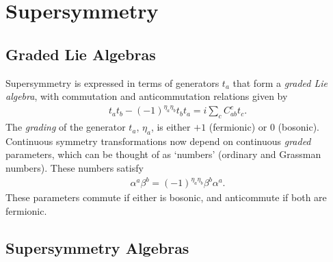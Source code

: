 \documentclass[twoside,english]{uiofysmaster}
\begin{document}
\chapter{Supersymmetry}

\section{Graded Lie Algebras}

Supersymmetry is expressed in terms of generators $t_a$ that form a \textit{graded Lie algebra}, with commutation and anticommutation relations given by
\begin{align}
t_at_b - (-1)^{\eta_a \eta_b} t_b t_a = i \sum_c C^c_{ab}t_c.
\end{align}
The \textit{grading} of the generator $t_a$, $\eta_a$, is either $+1$ (fermionic) or $0$ (bosonic). Continuous symmetry transformations now depend on continuous \textit{graded} parameters, which can be thought of as `numbers' (ordinary and Grassman numbers). These numbers satisfy
\begin{align}
\alpha^a \beta^b = (-1)^{\eta_a \eta_b} \beta^b \alpha^a.
\end{align}
These parameters commute if either is bosonic, and anticommute if both are fermionic.

\section{Supersymmetry Algebras}
\end{document}

